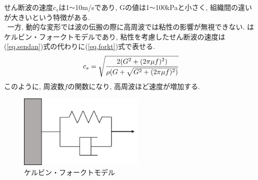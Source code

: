 せん断波の速度$c_s$は1\verb|〜|10m/sであり, Gの値は1\verb|〜|100kPaと小さく, 組織間の違いが大きいという特徴がある. 
\\\ 一方, 動的な変形では波の伝搬の際に高周波では粘性の影響が無視できない. はケルビン・フォークトモデルであり, 粘性を考慮したせん断波の速度は(\ref{eq.sendan})式の代わりに(\ref{eq.forkt})式で表せる. 
\begin{equation}
\label{eq.forkt}
\\\ c_s = \sqrt{\dfrac{2(G^2 + (2\pi \mu f)^2)}{\rho(G + \sqrt{G^2 + (2\pi \mu f)^2)}}}
\end{equation}
このように, 周波数$f$の関数になり, 高周波ほど速度が増加する. 
\begin{figure}[H]
  \begin{center}
    \includegraphics[width=60mm]{fig/forkt.pdf}
  \end{center}
  \caption{ケルビン・フォークトモデル}
\end{figure}

